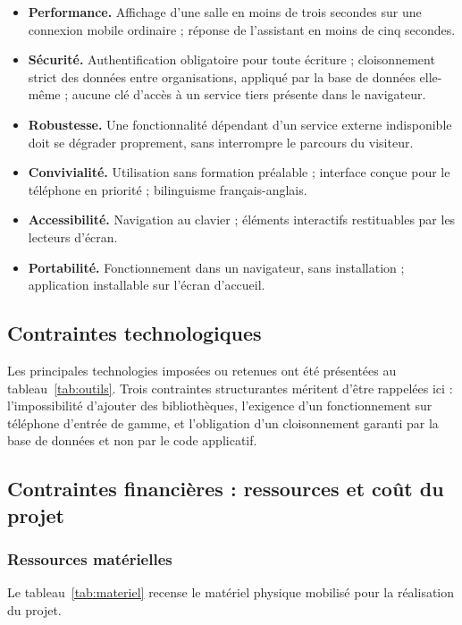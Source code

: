 \begin{itemize}
  \item \textbf{Performance.} Affichage d'une salle en moins de trois secondes
        sur une connexion mobile ordinaire ; réponse de l'assistant en moins de
        cinq secondes.
  \item \textbf{Sécurité.} Authentification obligatoire pour toute écriture ;
        cloisonnement strict des données entre organisations, appliqué par la
        base de données elle-même ; aucune clé d'accès à un service tiers
        présente dans le navigateur.
  \item \textbf{Robustesse.} Une fonctionnalité dépendant d'un service externe
        indisponible doit se dégrader proprement, sans interrompre le parcours
        du visiteur.
  \item \textbf{Convivialité.} Utilisation sans formation préalable ; interface
        conçue pour le téléphone en priorité ; bilinguisme français-anglais.
  \item \textbf{Accessibilité.} Navigation au clavier ; éléments interactifs
        restituables par les lecteurs d'écran.
  \item \textbf{Portabilité.} Fonctionnement dans un navigateur, sans
        installation ; application installable sur l'écran d'accueil.
\end{itemize}

\subsection{Contraintes technologiques}

Les principales technologies imposées ou retenues ont été présentées au
tableau~\ref{tab:outils}. Trois contraintes structurantes méritent d'être
rappelées ici : l'impossibilité d'ajouter des bibliothèques, l'exigence d'un
fonctionnement sur téléphone d'entrée de gamme, et l'obligation d'un
cloisonnement garanti par la base de données et non par le code applicatif.

\subsection{Contraintes financières : ressources et coût du projet}

\subsubsection{Ressources matérielles}

Le tableau~\ref{tab:materiel} recense le matériel physique mobilisé pour la
réalisation du projet.

